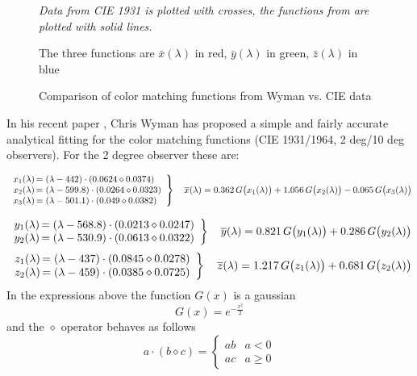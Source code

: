 \begin{figure}
{
\centering

\caption{Comparison of color matching functions from Wyman vs. CIE data}
\label{fig:cmf1931wyman}
}
\vskip 1mm
{\footnotesize\it Data from CIE 1931 is plotted with crosses,
the functions from  \cite{wyman13} are plotted with solid lines.

The three functions are $\bar x(\lambda)$ in red, $\bar y(\lambda)$ in green,
$\bar z(\lambda)$ in blue}
\end{figure}

In his recent paper \cite{wyman13}, Chris Wyman has proposed a simple
and fairly accurate analytical fitting for the color matching
functions (CIE 1931/1964, 2 deg/10 deg observers). For the 2 degree
observer these are:

\begin{equation}
\left.\begin{array}{r@{\,}l}
x_1(\lambda) &= (\lambda-442)   \cdot (0.0624 \diamond 0.0374) \\
x_2(\lambda) &= (\lambda-599.8) \cdot (0.0264 \diamond 0.0323) \\
x_3(\lambda) &= (\lambda-501.1) \cdot (0.049  \diamond 0.0382) \\
\end{array}\right\}\quad
\overline{x}(\lambda) =
  0.362\,G\big(x_1(\lambda)\big)
+ 1.056\,G\big(x_2(\lambda)\big)
- 0.065\,G\big(x_3(\lambda)\big)
\end{equation}

\begin{equation}
\left.\begin{array}{r@{\,}l}
y_1(\lambda) &= (\lambda-568.8) \cdot (0.0213 \diamond 0.0247) \\
y_2(\lambda) &= (\lambda-530.9) \cdot (0.0613 \diamond 0.0322) \\
\end{array}\right\}\quad
\overline{y}(\lambda) =
   0.821\,G\big(y_1(\lambda)\big)
 + 0.286 \,G\big(y_2(\lambda)\big)
\end{equation}
\begin{equation}
\left.\begin{array}{r@{\,}l}
z_1(\lambda) &= (\lambda-437) \cdot (0.0845 \diamond 0.0278) \\
z_2(\lambda) &= (\lambda-459) \cdot (0.0385 \diamond 0.0725) \\
\end{array}\right\}\quad
\overline{z}(\lambda) =
   1.217\,G\big(z_1(\lambda)\big)
 + 0.681 \,G\big(z_2(\lambda)\big)
\end{equation}
In the expressions above the function $G(x)$ is a gaussian
\begin{equation}
G(x) = e^{-\frac{x^2}{2}}
\end{equation}
and the $\diamond$ operator behaves as follows
\begin{equation}
a \cdot (b \diamond c) =
\begin{cases}
ab & a < 0 \\
ac & a \geq 0
\end{cases}
\end{equation}

